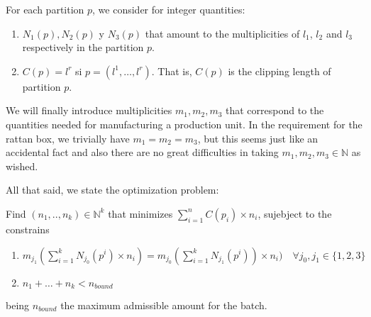 \documentclass[12pt, letterpaper]{article}
\begin{document}
\vspace{10px}

For each partition $p$, we consider for integer quantities:
\begin{enumerate}
    \item $N_1(p), N_2(p)$ y $N_3(p)$ that amount to the multiplicities of $l_1$, $l_2$ and $l_3$ respectively in the partition $p$.
    \item $C(p) = l^r$ si $p = (l^1,\dots,l^r)$. That is, $C(p)$ is the clipping length of partition $p$.
\end{enumerate}
\vspace{10px}
We will finally introduce multiplicities $m_1, m_2, m_3$ that correspond to the quantities needed for manufacturing a production unit. In the requirement for the rattan box, we trivially have $m_1 = m_2 = m_3$, but this seems just like an accidental fact and also there are no great difficulties in taking $m_1, m_2, m_3 \in\mathbb{N}$ as wished.
\vspace{10px}
\par
All that said, we state the optimization problem:
\par
\vspace{10px}
Find $(n_1,..,n_k)\in\mathbb{N}^k$ that minimizes $\sum_{i=1}^n C(p_i)\times n_i$, sujebject to the constrains
\begin{enumerate}
    \item $m_{j_1}(\sum_{i=1}^k N_{j_0}(p^i)\times n_i) = m_{j_0}(\sum_{i=1}^k N_{j_1}(p^i))\times n_i)\quad\forall j_0, j_1\in \{1, 2, 3\}$
    \item $n_1 + \dots + n_k < n_{bound}$
\end{enumerate}
being $n_{bound}$ the maximum admissible amount for the batch. \\


\vspace{10px}
\par
\end{document}
